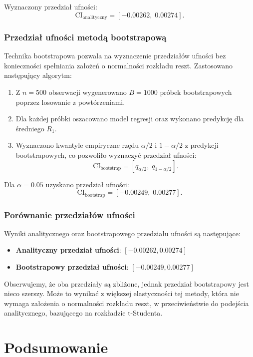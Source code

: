 \documentclass[12pt]{article}
\begin{document}
Wyznaczony przedział ufności:
\[
\text{CI}_{\text{analityczny}} = [-0.00262, \; 0.00274].
\]

\subsubsection{Przedział ufności metodą bootstrapową}
Technika bootstrapowa pozwala na wyznaczenie przedziałów ufności bez konieczności spełniania założeń o normalności rozkładu reszt. Zastosowano następujący algorytm:
\begin{enumerate}
    \item Z \( n = 500 \) obserwacji wygenerowano \(B = 1000\) próbek bootstrapowych poprzez losowanie z powtórzeniami.
    \item Dla każdej próbki oszacowano model regresji oraz wykonano predykcję dla średniego \(R_1\).
    \item Wyznaczono kwantyle empiryczne rzędu \(\alpha/2\) i \(1-\alpha/2\) z predykcji bootstrapowych, co pozwoliło wyznaczyć przedział ufności:
    \[
    \text{CI}_{\text{bootstrap}} = \left[ q_{\alpha/2}, \; q_{1-\alpha/2} \right].
    \]
\end{enumerate}

Dla \( \alpha = 0.05 \) uzyskano przedział ufności:
\[
\text{CI}_{\text{bootstrap}} = [-0.00249, \;  0.00277].
\]

\subsubsection{Porównanie przedziałów ufności}
Wyniki analitycznego oraz bootstrapowego przedziału ufności są następujące:

\begin{itemize}
    \item \textbf{Analityczny przedział ufności}: $[-0.00262, 0.00274]$
    \item \textbf{Bootstrapowy przedział ufności}: $[-0.00249, 0.00277]$
\end{itemize}

Obserwujemy, że oba przedziały są zbliżone, jednak przedział bootstrapowy jest nieco szerszy. Może to wynikać z większej elastyczności tej metody, która nie wymaga założenia o normalności rozkładu reszt, w przeciwieństwie do podejścia analitycznego, bazującego na rozkładzie t-Studenta.

\section{Podsumowanie}
\end{document}
